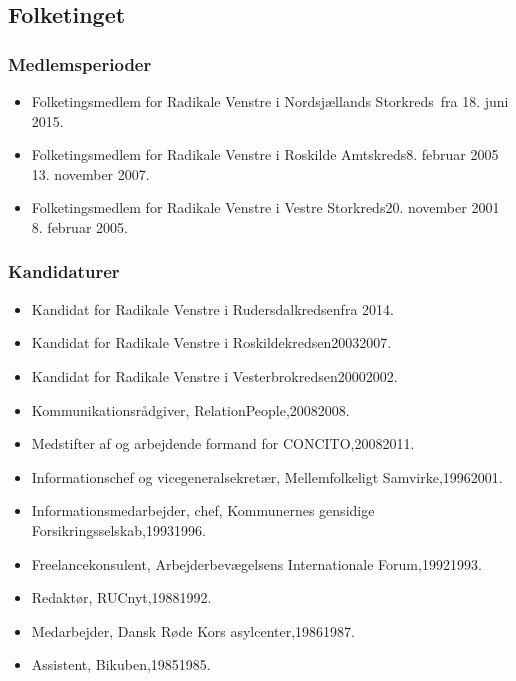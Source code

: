 \documentclass[11pt, a4paper]{awesome-cv}
\begin{document}
\begin{cvletter}
\subsection*{Folketinget}
\subsubsection*{Medlemsperioder}
\begin{itemize}
\item Folketingsmedlem for Radikale Venstre i Nordsjællands Storkreds fra 18. juni 2015.
\item Folketingsmedlem for Radikale Venstre i Roskilde Amtskreds8. februar 2005  13. november 2007.
\item Folketingsmedlem for Radikale Venstre i Vestre Storkreds20. november 2001  8. februar 2005.
\end{itemize}
\subsubsection*{Kandidaturer}
\begin{itemize}
\item Kandidat for Radikale Venstre i Rudersdalkredsenfra 2014.
\item Kandidat for Radikale Venstre i Roskildekredsen20032007.
\item Kandidat for Radikale Venstre i Vesterbrokredsen20002002.
\end{itemize}
\begin{itemize}
\item Kommunikationsrådgiver, RelationPeople,20082008.
\item Medstifter af og arbejdende formand for CONCITO,20082011.
\item Informationschef og vicegeneralsekretær, Mellemfolkeligt Samvirke,19962001.
\item Informationsmedarbejder, chef, Kommunernes gensidige Forsikringsselskab,19931996.
\item Freelancekonsulent, Arbejderbevægelsens Internationale Forum,19921993.
\item Redaktør, RUCnyt,19881992.
\item Medarbejder, Dansk Røde Kors asylcenter,19861987.
\item Assistent, Bikuben,19851985.
\end{itemize}
\end{cvletter}
\end{document}
